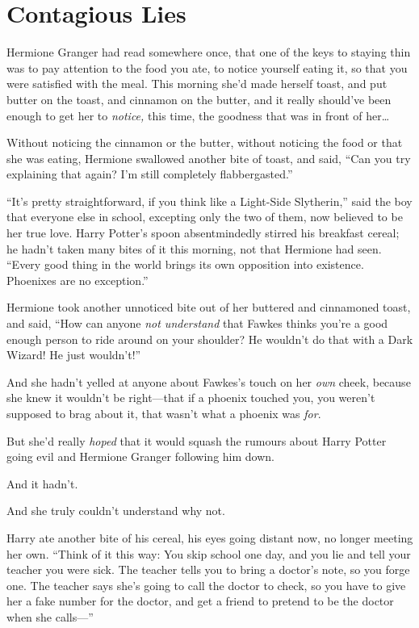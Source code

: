 \chapter{Contagious Lies}

Hermione Granger had read somewhere once, that one of the keys to
staying thin was to pay attention to the food you ate, to notice
yourself eating it, so that you were satisfied with the meal. This
morning she'd made herself toast, and put butter on the toast, and
cinnamon on the butter, and it really should've been enough to get her
to \emph{notice,} this time, the goodness that was in front of
her\ldots{}

Without noticing the cinnamon or the butter, without noticing the food
or that she was eating, Hermione swallowed another bite of toast, and
said, ``Can you try explaining that again? I'm still completely
flabbergasted.''

``It's pretty straightforward, if you think like a Light-Side
Slytherin,'' said the boy that everyone else in school, excepting only
the two of them, now believed to be her true love. Harry Potter's spoon
absentmindedly stirred his breakfast cereal; he hadn't taken many bites
of it this morning, not that Hermione had seen. ``Every good thing in
the world brings its own opposition into existence. Phoenixes are no
exception.''

Hermione took another unnoticed bite out of her buttered and cinnamoned
toast, and said, ``How can anyone \emph{not understand} that Fawkes
thinks you're a good enough person to ride around on your shoulder? He
wouldn't do that with a Dark Wizard! He just wouldn't!''

And she hadn't yelled at anyone about Fawkes's touch on her \emph{own}
cheek, because she knew it wouldn't be right---that if a phoenix touched
you, you weren't supposed to brag about it, that wasn't what a phoenix
was \emph{for}.

But she'd really \emph{hoped} that it would squash the rumours about
Harry Potter going evil and Hermione Granger following him down.

And it hadn't.

And she truly couldn't understand why not.

Harry ate another bite of his cereal, his eyes going distant now, no
longer meeting her own. ``Think of it this way: You skip school one day,
and you lie and tell your teacher you were sick. The teacher tells you
to bring a doctor's note, so you forge one. The teacher says she's going
to call the doctor to check, so you have to give her a fake number for
the doctor, and get a friend to pretend to be the doctor when she
calls---''

